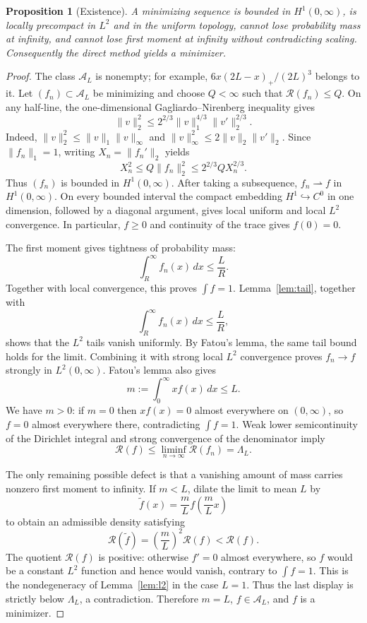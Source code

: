 \documentclass[11pt]{article}
\newtheorem{proposition}[theorem]{Proposition}
\theoremstyle{definition}
\theoremstyle{remark}
\newcommand{\A}{\mathcal A}
\newcommand{\Rcal}{\mathcal R}
\begin{document}
\begin{proposition}[Existence]\label{prop:existence}
A minimizing sequence is bounded in $H^1(0,\infty)$, is locally precompact in $L^2$ and in the uniform topology, cannot lose probability mass at infinity, and cannot lose first moment at infinity without contradicting scaling. Consequently the direct method yields a minimizer.
\end{proposition}
\begin{proof}
The class $\A_L$ is nonempty; for example,
$6x(2L-x)_+/(2L)^3$ belongs to it. Let $(f_n)\subset\A_L$ be minimizing
and choose $Q<\infty$ such that $\Rcal(f_n)\leq Q$. On any half-line,
the one-dimensional Gagliardo--Nirenberg inequality gives
\begin{equation}\label{eq:gn}
 \|v\|_2^2
 \leq 2^{2/3}\|v\|_1^{4/3}\|v'\|_2^{2/3}.
\end{equation}
Indeed, $\|v\|_2^2\leq\|v\|_1\|v\|_\infty$ and
$\|v\|_\infty^2\leq2\|v\|_2\|v'\|_2$. Since $\|f_n\|_1=1$, writing $X_n=\|f_n'\|_2$ yields
\[
 X_n^2\leq Q\|f_n\|_2^2
 \leq 2^{2/3}QX_n^{2/3}.
\]
Thus $(f_n)$ is bounded in $H^1(0,\infty)$. After taking a subsequence,
$f_n\rightharpoonup f$ in $H^1(0,\infty)$. On every bounded interval the
compact embedding $H^1\hookrightarrow C^0$ in one dimension, followed by a
diagonal argument, gives local uniform and local $L^2$ convergence. In
particular, $f\geq0$ and continuity of the trace gives $f(0)=0$.

The first moment gives tightness of probability mass:
\[
 \int_R^\infty f_n(x)\,dx\leq\frac{L}{R}.
\]
Together with local convergence, this proves $\int f=1$. Lemma~\ref{lem:tail}, together with
\[
 \int_R^\infty f_n(x)\,dx\leq\frac{L}{R},
\]
shows that the $L^2$ tails vanish uniformly. By Fatou's lemma, the same tail bound holds for the limit. Combining it with strong local $L^2$ convergence proves
$f_n\to f$ strongly in $L^2(0,\infty)$. Fatou's lemma also gives
\[
 m:=\int_0^\infty xf(x)\,dx\leq L.
\]
We have $m>0$: if $m=0$ then $xf(x)=0$ almost everywhere on $(0,\infty)$, so
$f=0$ almost everywhere there, contradicting $\int f=1$. Weak lower semicontinuity of the
Dirichlet integral and strong convergence of the denominator imply
\[
 \Rcal(f)\leq\liminf_{n\to\infty}\Rcal(f_n)=\Lambda_L.
\]

The only remaining possible defect is that a vanishing amount of mass carries nonzero first moment to infinity. If $m<L$, dilate the limit to mean $L$ by
\[
 \widetilde f(x)=\frac{m}{L}f\!\left(\frac{m}{L}x\right)
\]
to obtain an admissible density satisfying
\[
 \Rcal(\widetilde f)=\left(\frac{m}{L}\right)^2\Rcal(f)<\Rcal(f).
\]
The quotient $\Rcal(f)$ is positive: otherwise $f'=0$ almost everywhere, so
$f$ would be a constant $L^2$ function and hence would vanish, contrary to
$\int f=1$. This is the nondegeneracy of
Lemma~\ref{lem:l2} in the case $L=1$. Thus the last display is strictly below $\Lambda_L$, a
contradiction. Therefore $m=L$, $f\in\A_L$, and $f$ is a minimizer.
\end{proof}
\end{document}
